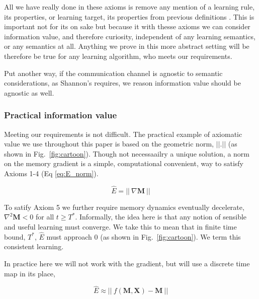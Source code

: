 All we have really done in these axioms is remove any mention of a learning rule, its properties, or learning target, its properties from previous definitions \cite{Itti2009,Jaegle2019,Schmidhuber1991,Inglis2001,Reddy2016,Pirolli2007}. This is important not for its on sake but because it with thesse axioms we can consider information value, and therefore curiosity, independent of any learning semantics, or any semantics at all. Anything we prove in this more abstract setting will be therefore be true for any learning algorithm, who meets our requirements. 

Put another way, if the communication channel is agnostic to semantic considerations, as Shannon's requires, we reason information value should be agnostic as well.


\subsubsection*{Practical information value}
Meeting our requirements is not difficult. The practical example of axiomatic value we use throughout this paper is based on the geometric norm, $||.||$ (as shown in Fig.~\ref{fig:cartoon}). Though not necessaailry a unique solution, a norm on the memory gradient is a simple, computational convenient, way to satisfy Axioms 1-4 (Eq \ref{eq:E_norm}). 

\begin{equation}
	\label{eq:E_norm}
	\hat E = || \ \nabla \mathbf{M} \ ||
\end{equation}

To satify Axiom 5 we further require memory dynamics eventually decelerate,  $\nabla^2 \mathbf{M} < 0$ for all $ t \ge T^*$. Informally, the idea here is that any notion of sensible and useful learning must converge. We take this to mean that in finite time bound, $T^*$, $\hat E$ must approach 0 (as shown in Fig.~\ref{fig:cartoon}). We term this consistent learning.

In practice here we will not work with the gradient, but will use a discrete time map in its place,

\begin{equation}
	\label{eq:E_norm_discrete}
	\hat E \approx || \ f(\mathbf{M},\mathbf{X}) - \mathbf{M} \ ||
\end{equation}

